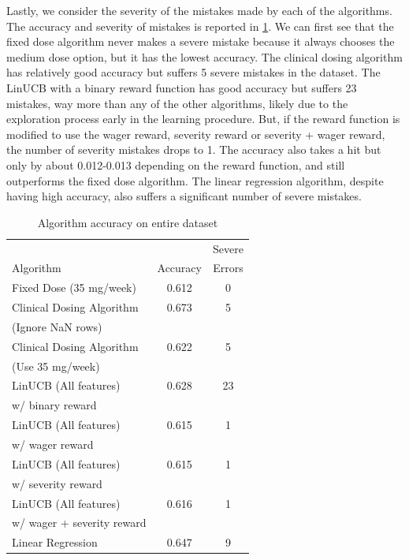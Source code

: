 \documentclass{article}
\begin{document}
Lastly, we consider the severity of the mistakes made by each of the algorithms. The accuracy and severity of mistakes is reported in \cref{severity-table}. We can first see that the fixed dose algorithm never makes a severe mistake because it always chooses the medium dose option, but it has the lowest accuracy. The clinical dosing algorithm has relatively good accuracy but suffers 5 severe mistakes in the dataset. The LinUCB with a binary reward function has good accuracy but suffers 23 mistakes, way more than any of the other algorithms, likely due to the exploration process early in the learning procedure. But, if the reward function is modified to use the wager reward, severity reward or severity + wager reward, the number of severity mistakes drops to 1. The accuracy also takes a hit but only by about 0.012-0.013 depending on the reward function, and still outperforms the fixed dose algorithm. The linear regression algorithm, despite having high accuracy, also suffers a significant number of severe mistakes.

\begin{table}[t]
\caption{Algorithm accuracy on entire dataset}
\label{severity-table}
\vskip 0.15in
\begin{center}
\begin{small}
\begin{sc}
\begin{tabular}{lcc}
\toprule
 &  & Severe\\
Algorithm & Accuracy & Errors \\
\midrule
Fixed Dose (35 mg/week)    & 0.612 & 0  \\
Clinical Dosing Algorithm  &  0.673 & 5  \\
\quad (Ignore NaN rows) & &\\
Clinical Dosing Algorithm  & 0.622 & 5 \\
\quad (Use 35 mg/week) & \\

LinUCB  (All features)  & 0.628 & 23 \\
\quad w/ binary reward & & \\

LinUCB  (All features)  & 0.615 & 1 \\
\quad w/ wager reward & & \\

LinUCB  (All features)  & 0.615 & 1 \\
\quad w/ severity reward & & \\

LinUCB  (All features)  & 0.616 & 1 \\
\quad w/ wager + severity reward & & \\

Linear Regression & 0.647 & 9\\
\bottomrule
\end{tabular}
\end{sc}
\end{small}
\end{center}
\vskip -0.1in
\end{table}
\end{document}
